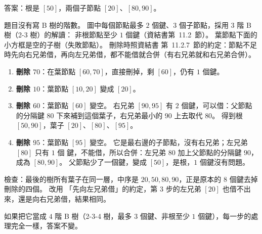 \begin{pastsoln}
答案：根是 $[50]$，兩個子節點 $[20]$、$[80, 90]$。

題目沒有寫 B 樹的階數。 圖中每個節點最多 $2$ 個鍵、$3$ 個子節點，採用 $3$ 階 B 樹（2-3 樹）的解讀：
非根節點至少 $1$ 個鍵（資結書第~11.2~節）。 葉節點下面的小方框是空的子樹（失敗節點）。 刪除時照資結書
第~11.2.7~節的約定：節點不足時先向右兄弟借，再向左兄弟借，都不能借就合併（有右兄弟就和右兄弟合併）。
\begin{enumerate}
\item \textbf{刪除 $70$}：在葉節點 $[60, 70]$，直接刪掉，剩 $[60]$，仍有 $1$ 個鍵。
\item \textbf{刪除 $10$}：葉節點 $[10, 20]$ 變成 $[20]$。
\item \textbf{刪除 $60$}：葉節點 $[60]$ 變空。 右兄弟 $[90, 95]$ 有 $2$ 個鍵，可以借：父節點的分隔鍵 $80$
下來補到這個葉子，右兄弟最小的 $90$ 上去取代 $80$。 得到根 $[50, 90]$，葉子 $[20]$、$[80]$、$[95]$。
\item \textbf{刪除 $95$}：葉節點 $[95]$ 變空。 它是最右邊的子節點，沒有右兄弟；左兄弟 $[80]$ 只有 $1$ 個
鍵，不能借，所以合併：左兄弟 $80$ 加上父節點的分隔鍵 $90$，成為 $[80, 90]$。 父節點少了一個鍵，變成
$[50]$，是根，$1$ 個鍵沒有問題。
\end{enumerate}
\begin{center}
\end{center}
檢查：最後的樹所有葉子在同一層，中序是 $20, 50, 80, 90$，正是原本的 $8$ 個鍵去掉刪除的四個。 改用
「先向左兄弟借」的約定，第 3 步的左兄弟 $[20]$ 也借不出來，還是向右兄弟借，結果相同。

如果把它當成 $4$ 階 B 樹（2-3-4 樹，最多 $3$ 個鍵、非根至少 $1$ 個鍵），每一步的處理完全一樣，答案不變。
\end{pastsoln}
